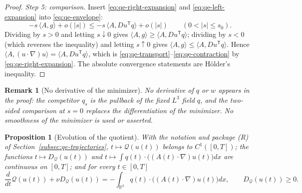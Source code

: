 \documentclass[11pt]{article}
\newtheorem{proposition}[theorem]{Proposition}
\newtheorem{remark}[theorem]{Remark}
\theoremstyle{definition}
\theoremstyle{plain}
\newcommand{\R}{\mathbb R}
\begin{document}
\begin{proof}
\emph{Step 5: comparison.}  Insert \eqref{eq:qe-right-expansion} and
\eqref{eq:qe-left-expansion} into \eqref{eq:qe-envelope}:
\[
 -s\,\langle A,g\rangle+o(|s|)\le-s\,\langle A,Du^{\mathsf T}q\rangle+o(|s|)
 \qquad(0<|s|\le s_0).
\]
Dividing by $s>0$ and letting $s\downarrow0$ gives
$\langle A,g\rangle\ge\langle A,Du^{\mathsf T}q\rangle$; dividing by $s<0$
(which reverses the inequality) and letting $s\uparrow0$ gives
$\langle A,g\rangle\le\langle A,Du^{\mathsf T}q\rangle$.  Hence
$\langle A,(u\cdot\nabla)u\rangle=\langle A,Du^{\mathsf T}q\rangle$, which is
\eqref{eq:qe-transport}--\eqref{eq:qe-contraction} by
\eqref{eq:qe-right-expansion}.  The absolute convergence statements are
H\"older's inequality.
\end{proof}

\begin{remark}[No derivative of the minimizer]\label{rem:qe-transport-scope}
No derivative of $q$ or $w$ appears in the proof: the competitor $q_s$ is
the pullback of the fixed $L^3$ field $q$, and the two-sided comparison at
$s=0$ replaces the differentiation of the minimizer.  No smoothness of the
minimizer is used or asserted.
\end{remark}

\begin{proposition}[Evolution of the quotient]\label{prop:quotient-evolution}
With the notation and package (R) of Section~\ref{subsec:qe-trajectories},
$t\mapsto\mathcal Q(u(t))$ belongs to $C^1([0,T])$; the functions
$t\mapsto D_{\mathcal Q}(u(t))$ and
$t\mapsto\int q(t)\cdot\bigl((A(t)\cdot\nabla)u(t)\bigr)dx$ are continuous
on $[0,T]$; and for every $t\in[0,T]$
\begin{equation}\label{eq:quotient-evolution}
 \frac d{dt}\mathcal Q(u(t))+\nu D_{\mathcal Q}(u(t))
 =-\int_{\R^3}q(t)\cdot\bigl((A(t)\cdot\nabla)u(t)\bigr)dx,
 \qquad D_{\mathcal Q}(u(t))\ge0 .
\end{equation}
\end{proposition}
\end{document}
